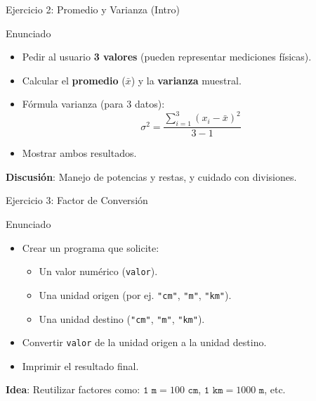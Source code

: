 \documentclass[10pt]{beamer}
\begin{document}
\begin{frame}{Ejercicio 2: Promedio y Varianza (Intro)}
  \begin{block}{Enunciado}
    \begin{itemize}
      \item Pedir al usuario \textbf{3 valores} (pueden representar mediciones físicas).
      \item Calcular el \textbf{promedio} (\(\bar{x}\)) y la \textbf{varianza} muestral.
      \item Fórmula varianza (para 3 datos):
      \[
        \sigma^2 = \frac{\sum_{i=1}^{3}(x_i - \bar{x})^2}{3 - 1}
      \]
      \item Mostrar ambos resultados.
    \end{itemize}
  \end{block}
  \textbf{Discusión}: Manejo de potencias y restas, y cuidado con divisiones.
\end{frame}

\begin{frame}{Ejercicio 3: Factor de Conversión}
  \begin{block}{Enunciado}
    \begin{itemize}
      \item Crear un programa que solicite:
        \begin{itemize}
          \item Un valor numérico (\texttt{valor}).
          \item Una unidad origen (por ej. \texttt{"cm"}, \texttt{"m"}, \texttt{"km"}).
          \item Una unidad destino (\texttt{"cm"}, \texttt{"m"}, \texttt{"km"}).
        \end{itemize}
      \item Convertir \texttt{valor} de la unidad origen a la unidad destino.
      \item Imprimir el resultado final.
    \end{itemize}
  \end{block}
  \textbf{Idea}: Reutilizar factores como: \(\texttt{1 m} = 100 \texttt{ cm}\), \(\texttt{1 km} = 1000 \texttt{ m}\), etc.
\end{frame}
\end{document}
